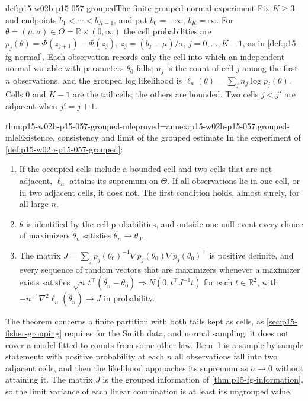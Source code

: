 \begin{hbdefinition}{def:p15-w02b-p15-057-grouped}{The finite grouped normal experiment}
Fix \(K\geq3\) and endpoints \(b_1<\cdots<b_{K-1}\), and put
\(b_0=-\infty\), \(b_K=\infty\). For \(\theta=(\mu,\sigma)\in
\Theta=\mathbb R\times(0,\infty)\) the cell probabilities are
\(p_j(\theta)=\Phi(z_{j+1})-\Phi(z_j)\), \(z_j=(b_j-\mu)/\sigma\),
\(j=0,\ldots,K-1\), as in \cref{def:p15-fg-normal}. Each observation
records only the cell into which an independent normal variable with
parameters \(\theta_0\) falls; \(n_j\) is the count of cell \(j\) among
the first \(n\) observations, and the grouped log likelihood is
\(\ell_n(\theta)=\sum_jn_j\log p_j(\theta)\). Cells \(0\) and \(K-1\) are
the tail cells; the others are bounded. Two cells \(j<j'\) are adjacent
when \(j'=j+1\).
\end{hbdefinition}

\begin{hbtheorem}{thm:p15-w02b-p15-057-grouped-mle}{proved=annex:p15-w02b-p15-057.grouped-mle}{Existence, consistency and limit of the grouped estimate}
In the experiment of \cref{def:p15-w02b-p15-057-grouped}:
\begin{enumerate}
\item If the occupied cells include a bounded cell and two cells that are
 not adjacent, \(\ell_n\) attains its supremum on \(\Theta\). If all
 observations lie in one cell, or in two adjacent cells, it does not.
 The first condition holds, almost surely, for all large \(n\).
\item \(\theta\) is identified by the cell probabilities, and outside one
 null event every choice of maximizers \(\widehat\theta_n\) satisfies
 \(\widehat\theta_n\to\theta_0\).
\item The matrix
 \(J=\sum_jp_j(\theta_0)^{-1}\nabla p_j(\theta_0)\nabla
 p_j(\theta_0)^{\top}\) is positive definite, and every sequence of random
 vectors that are maximizers whenever a maximizer exists satisfies
 \(\sqrt n\,t^{\top}(\widehat\theta_n-\theta_0)\Rightarrow
 N(0,t^{\top}J^{-1}t)\) for each \(t\in\mathbb R^2\), with
 \(-n^{-1}\nabla^2\ell_n(\widehat\theta_n)\to J\) in probability.
\end{enumerate}
\end{hbtheorem}

The theorem concerns a finite partition with both tails kept as cells, as
\cref{sec:p15-fisher-grouping} requires for the Smith data, and normal
sampling; it does not cover a model fitted to counts from some other law.
Item~1 is a sample-by-sample statement: with positive probability at each
\(n\) all observations fall into two adjacent cells, and then the
likelihood approaches its supremum as \(\sigma\to0\) without attaining
it. The matrix \(J\) is the grouped information of
\cref{thm:p15-fg-information}, so the limit variance of each linear
combination is at least its ungrouped value.

